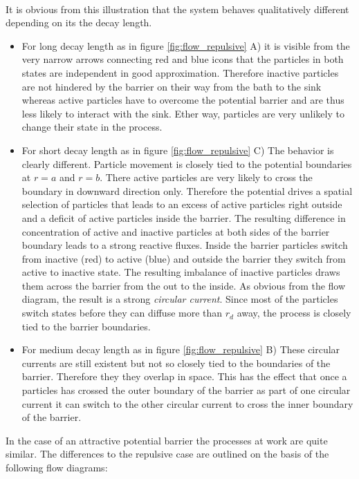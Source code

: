 \vspace{0.5 cm} \\
It is obvious from this illustration that the system behaves qualitatively different depending on its the decay length.
\begin{itemize}
    \item For long decay length as in figure \ref{fig:flow_repulsive} A) it is visible from the very narrow arrows connecting red and blue icons that the particles in both states are independent in good approximation. Therefore inactive particles are not hindered by the barrier on their way from the bath to the sink whereas active particles have to overcome the potential barrier and are thus less likely to interact with the sink. Ether way, particles are very unlikely to change their state in the process. 
    \item For short decay length as in figure \ref{fig:flow_repulsive} C) The behavior is clearly different. Particle movement is closely tied to the potential boundaries at $r=a$ and $r=b$. There active particles are very likely to cross the boundary in downward direction only. Therefore the potential drives a spatial selection of particles that leads to an excess of active particles right outside and a deficit of active particles inside the barrier. The resulting difference in concentration of active and inactive particles at both sides of the barrier boundary leads to a strong reactive fluxes. Inside the barrier particles switch from inactive (red) to active (blue) and outside the barrier they switch from active to inactive state. The resulting imbalance of inactive particles draws them across the barrier from the out to the inside. As obvious from the flow diagram, the result is a strong \emph{circular current}. Since most of the particles switch states before they can diffuse more than $r_d$ away, the process is closely tied to the barrier boundaries. 
    \item For medium decay length as in figure \ref{fig:flow_repulsive} B) These circular currents are still existent but not so closely tied to the boundaries of the barrier. Therefore they they overlap in space. This has the effect that once a particles has crossed the outer boundary of the barrier as part of one circular current it can switch to the other circular current to cross the inner boundary of the barrier. 
\end{itemize}
In the case of an attractive potential barrier the processes at work are quite similar. The differences to the repulsive case are outlined on the basis of the following flow diagrams: \vspace{-.5 cm} \\

